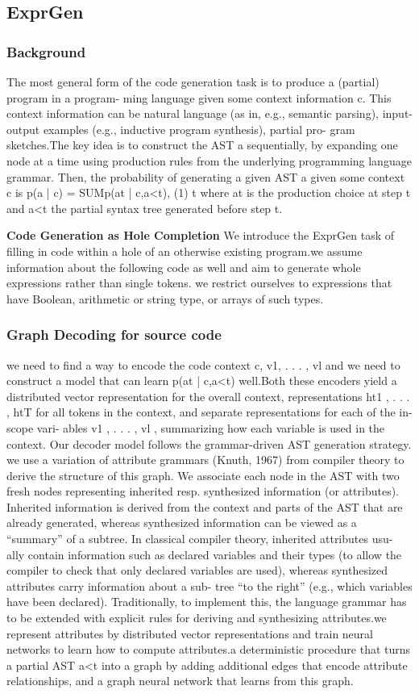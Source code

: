 \documentclass{article}
\begin{document}
\subsection{ExprGen}
\subsubsection{Background}
The most general form of the code generation task is to produce a (partial) program in a program- ming language given some context information c. This context information can be natural language (as in, e.g., semantic parsing), input-output examples (e.g., inductive program synthesis), partial pro- gram sketches.The key idea is to construct the AST a sequentially, by expanding one node at a time using production rules from the underlying programming language grammar.  Then, the probability of generating a given AST a given some context c is
p(a | c) = SUMp(at | c,a<t), (1) t
where at is the production choice at step t and a<t the partial syntax tree generated before step t.

\textbf{Code Generation as Hole Completion} We introduce the ExprGen task of filling in code within a hole of an otherwise existing program.we assume information about the following code as well and aim to generate whole expressions rather than single tokens. we restrict ourselves to expressions that have Boolean, arithmetic or string type, or arrays of such types.
\subsubsection{Graph Decoding for source code}
we need to find a way to encode the code context c, v1, . . . , vl and we need to construct a model that can learn p(at | c,a<t) well.Both these encoders yield a distributed vector representation for the overall context, representations ht1 , . . . , htT for all tokens in the context, and separate representations for each of the in-scope vari- ables v1 , . . . , vl , summarizing how each variable is used in the context.  Our decoder model follows the grammar-driven AST generation strategy. we use a variation of attribute grammars (Knuth, 1967) from compiler theory to derive the structure of this graph. We associate each node in the AST with two fresh nodes representing inherited resp. synthesized information (or attributes). Inherited information is derived from the context and parts of the AST that are already generated, whereas synthesized information can be viewed as a “summary” of a subtree. In classical compiler theory, inherited attributes usu- ally contain information such as declared variables and their types (to allow the compiler to check that only declared variables are used), whereas synthesized attributes carry information about a sub- tree “to the right” (e.g., which variables have been declared). Traditionally, to implement this, the language grammar has to be extended with explicit rules for deriving and synthesizing attributes.we represent attributes by distributed vector representations and train neural networks to learn how to compute attributes.a deterministic procedure that turns a partial AST a<t into a graph by adding additional edges that encode attribute relationships, and a graph neural network that learns from this graph.
\end{document}
